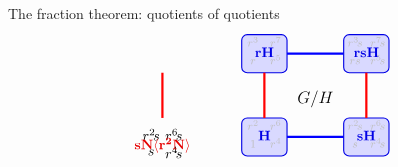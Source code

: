 \documentclass[8pt, handout]{beamer}
\begin{document}
\begin{frame}{The fraction theorem: quotients of quotients}
\[\begin{tikzpicture}[xscale=.95,scale=.6]
\begin{scope}
\begin{scope}[shift={(4.5,0)}]
        \node at (.5,.9) {$r^2\!s$};
        \node at (1.5,.9) {$r^6\!s$};
        \node at (.5,.15) {$s$};
        \node at (1.5,.15) {$r^4\!s$};
        \node[xRed] at (1,.45) {\normalsize $\mathbf{sN\<r^2N\>}$};
        \draw[ultra thick,eRed] (1,1.6)--(1,3.5);
      \end{scope}  
    \end{scope}
    \begin{scope}[shift={(9,0)}]
      \node at (3.25,2.4) {\large $G/H$};
      \tikzstyle{every node}=[font=\footnotesize,anchor=south,faded]
      \begin{scope}[shift={(0,3.5)}]
        \draw[thick,xBlue,fill=cosetBlue,rounded corners] (0,0) rectangle (2,1.6);
        \node at (.5,.9) {$r^3$};
        \node at (1.5,.9) {$r^7$};
        \node at (.5,.15) {$r$};
        \node at (1.5,.15) {$r^5$};
        \node[xBlue] at (1,.45) {\normalsize $\mathbf{rH}$};
        \draw[ultra thick,eBlue] (2,.8)--(4.5,.8);
      \end{scope}
      \begin{scope}[shift={(0,0)}]
        \draw[thick,xBlue,fill=cosetBlue,rounded corners] (0,0) rectangle (2,1.6);
        \node at (.5,.9) {$r^2$};
        \node at (1.5,.9) {$r^6$};
        \node at (.5,.15) {$1$};
        \node at (1.5,.15) {$r^4$};
        \node[xBlue] at (1,.45) {\normalsize $\mathbf{H}$};
        \draw[ultra thick,eRed] (1,1.6)--(1,3.5);
        \draw[ultra thick,eBlue] (2,.8)--(4.5,.8);
      \end{scope}
      \begin{scope}[shift={(4.5,3.5)}]
        \draw[thick,xBlue,fill=cosetBlue,rounded corners] (0,0) rectangle (2,1.6);
        \node at (.5,.9) {$r^3\!s$};
        \node at (1.5,.9) {$r^7\!s$};
        \node at (.5,.15) {$rs$};
        \node at (1.5,.15) {$r^5\!s$};
        \node[xBlue] at (1,.45) {\normalsize $\mathbf{rsH}$};
      \end{scope}
      \begin{scope}[shift={(4.5,0)}]
        \draw[thick,xBlue,fill=cosetBlue,rounded corners] (0,0) rectangle (2,1.6);
        \node at (.5,.9) {$r^2\!s$};
        \node at (1.5,.9) {$r^6\!s$};
        \node at (.5,.15) {$s$};
        \node at (1.5,.15) {$r^4\!s$};
        \node[xBlue] at (1,.45) {\normalsize $\mathbf{sH}$};
        \draw[ultra thick,eRed] (1,1.6)--(1,3.5);
      \end{scope}  
    \end{scope}
  \end{tikzpicture}
  \]
      
\end{frame}
\end{document}
